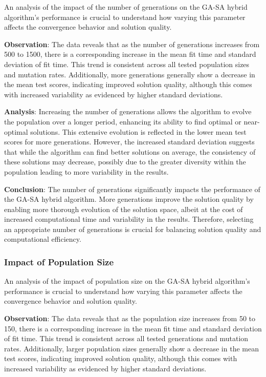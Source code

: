 \documentclass{article}
\begin{document}
    An analysis of the impact of the number of generations on the GA-SA hybrid algorithm’s performance is crucial to understand how varying this parameter affects the convergence behavior and solution quality.

    \textbf{Observation}: The data reveals that as the number of generations increases from 500 to 1500, there is a corresponding increase in the mean fit time and standard deviation of fit time. This trend is consistent across all tested population sizes and mutation rates. Additionally, more generations generally show a decrease in the mean test scores, indicating improved solution quality, although this comes with increased variability as evidenced by higher standard deviations.

    \textbf{Analysis}: Increasing the number of generations allows the algorithm to evolve the population over a longer period, enhancing its ability to find optimal or near-optimal solutions. This extensive evolution is reflected in the lower mean test scores for more generations. However, the increased standard deviation suggests that while the algorithm can find better solutions on average, the consistency of these solutions may decrease, possibly due to the greater diversity within the population leading to more variability in the results.

    \textbf{Conclusion}: The number of generations significantly impacts the performance of the GA-SA hybrid algorithm. More generations improve the solution quality by enabling more thorough evolution of the solution space, albeit at the cost of increased computational time and variability in the results. Therefore, selecting an appropriate number of generations is crucial for balancing solution quality and computational efficiency.

    \subsubsection{Impact of Population Size}

    An analysis of the impact of population size on the GA-SA hybrid algorithm’s performance is crucial to understand how varying this parameter affects the convergence behavior and solution quality.

    \textbf{Observation}: The data reveals that as the population size increases from 50 to 150, there is a corresponding increase in the mean fit time and standard deviation of fit time. This trend is consistent across all tested generations and mutation rates. Additionally, larger population sizes generally show a decrease in the mean test scores, indicating improved solution quality, although this comes with increased variability as evidenced by higher standard deviations.
\end{document}
